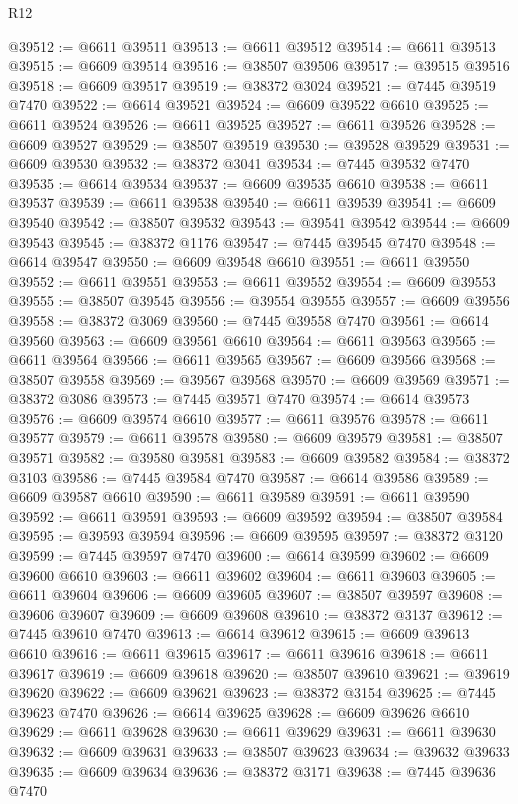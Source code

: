 \begin{lexlean}{R12}
\begin{coremodule}
@39512 := @6611 @39511
@39513 := @6611 @39512
@39514 := @6611 @39513
@39515 := @6609 @39514
@39516 := @38507 @39506
@39517 := @39515 @39516
@39518 := @6609 @39517
@39519 := @38372 @3024
@39521 := @7445 @39519 @7470
@39522 := @6614 @39521
@39524 := @6609 @39522 @6610
@39525 := @6611 @39524
@39526 := @6611 @39525
@39527 := @6611 @39526
@39528 := @6609 @39527
@39529 := @38507 @39519
@39530 := @39528 @39529
@39531 := @6609 @39530
@39532 := @38372 @3041
@39534 := @7445 @39532 @7470
@39535 := @6614 @39534
@39537 := @6609 @39535 @6610
@39538 := @6611 @39537
@39539 := @6611 @39538
@39540 := @6611 @39539
@39541 := @6609 @39540
@39542 := @38507 @39532
@39543 := @39541 @39542
@39544 := @6609 @39543
@39545 := @38372 @1176
@39547 := @7445 @39545 @7470
@39548 := @6614 @39547
@39550 := @6609 @39548 @6610
@39551 := @6611 @39550
@39552 := @6611 @39551
@39553 := @6611 @39552
@39554 := @6609 @39553
@39555 := @38507 @39545
@39556 := @39554 @39555
@39557 := @6609 @39556
@39558 := @38372 @3069
@39560 := @7445 @39558 @7470
@39561 := @6614 @39560
@39563 := @6609 @39561 @6610
@39564 := @6611 @39563
@39565 := @6611 @39564
@39566 := @6611 @39565
@39567 := @6609 @39566
@39568 := @38507 @39558
@39569 := @39567 @39568
@39570 := @6609 @39569
@39571 := @38372 @3086
@39573 := @7445 @39571 @7470
@39574 := @6614 @39573
@39576 := @6609 @39574 @6610
@39577 := @6611 @39576
@39578 := @6611 @39577
@39579 := @6611 @39578
@39580 := @6609 @39579
@39581 := @38507 @39571
@39582 := @39580 @39581
@39583 := @6609 @39582
@39584 := @38372 @3103
@39586 := @7445 @39584 @7470
@39587 := @6614 @39586
@39589 := @6609 @39587 @6610
@39590 := @6611 @39589
@39591 := @6611 @39590
@39592 := @6611 @39591
@39593 := @6609 @39592
@39594 := @38507 @39584
@39595 := @39593 @39594
@39596 := @6609 @39595
@39597 := @38372 @3120
@39599 := @7445 @39597 @7470
@39600 := @6614 @39599
@39602 := @6609 @39600 @6610
@39603 := @6611 @39602
@39604 := @6611 @39603
@39605 := @6611 @39604
@39606 := @6609 @39605
@39607 := @38507 @39597
@39608 := @39606 @39607
@39609 := @6609 @39608
@39610 := @38372 @3137
@39612 := @7445 @39610 @7470
@39613 := @6614 @39612
@39615 := @6609 @39613 @6610
@39616 := @6611 @39615
@39617 := @6611 @39616
@39618 := @6611 @39617
@39619 := @6609 @39618
@39620 := @38507 @39610
@39621 := @39619 @39620
@39622 := @6609 @39621
@39623 := @38372 @3154
@39625 := @7445 @39623 @7470
@39626 := @6614 @39625
@39628 := @6609 @39626 @6610
@39629 := @6611 @39628
@39630 := @6611 @39629
@39631 := @6611 @39630
@39632 := @6609 @39631
@39633 := @38507 @39623
@39634 := @39632 @39633
@39635 := @6609 @39634
@39636 := @38372 @3171
@39638 := @7445 @39636 @7470

\end{coremodule}
\end{lexlean}
